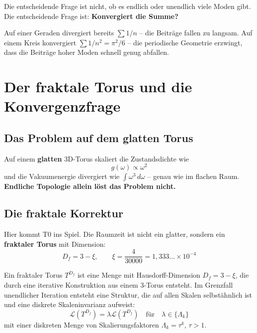 	Die entscheidende Frage ist nicht, ob es endlich oder unendlich viele Moden gibt. Die entscheidende Frage ist: \textbf{Konvergiert die Summe?}
	
	Auf einer Geraden divergiert bereits $\sum 1/n$ -- die Beiträge fallen zu langsam. Auf einem Kreis konvergiert $\sum 1/n^2 = \pi^2/6$ -- die periodische Geometrie erzwingt, dass die Beiträge hoher Moden schnell genug abfallen.
	
	
	\section{Der fraktale Torus und die Konvergenzfrage}
	
	\subsection{Das Problem auf dem glatten Torus}
	
	Auf einem \textbf{glatten} 3D-Torus skaliert die Zustandsdichte wie
	\begin{equation}
		g(\omega) \propto \omega^{2}
	\end{equation}
	und die Vakuumenergie divergiert wie $\int \omega^3 \, d\omega$ -- genau wie im flachen Raum. \textbf{Endliche Topologie allein löst das Problem nicht.}
	
	\subsection{Die fraktale Korrektur}
	
	Hier kommt T0 ins Spiel. Die Raumzeit ist nicht ein glatter, sondern ein \textbf{fraktaler Torus} mit Dimension:
	\begin{equation}
		D_f = 3 - \xi, \qquad \xi = \frac{4}{30000} = 1{,}333\ldots \times 10^{-4}
	\end{equation}
	
	\begin{keypoint}
		Ein fraktaler Torus $T^{D_f}$ ist eine Menge mit Hausdorff-Dimension $D_f = 3 - \xi$, die durch eine iterative Konstruktion aus einem 3-Torus entsteht. Im Grenzfall unendlicher Iteration entsteht eine Struktur, die auf allen Skalen selbstähnlich ist und eine diskrete Skaleninvarianz aufweist:
		\begin{equation}
			\mathcal{L}(T^{D_f}) = \lambda \mathcal{L}(T^{D_f}) \quad \text{für} \quad \lambda \in \{\Lambda_k\}
		\end{equation}
		mit einer diskreten Menge von Skalierungsfaktoren $\Lambda_k = \tau^k$, $\tau > 1$.
	\end{keypoint}
	
